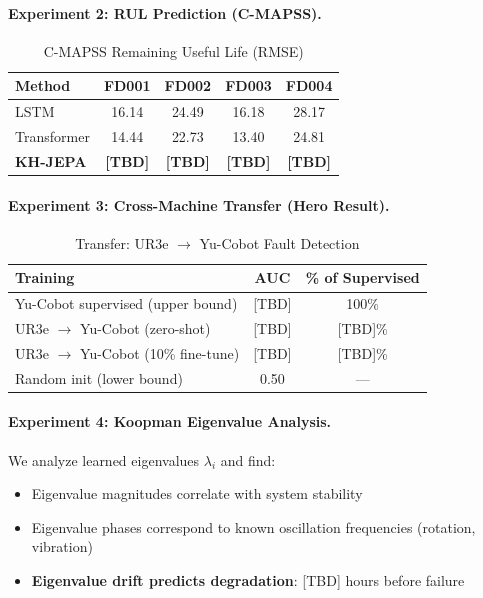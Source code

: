 \documentclass{article}
\begin{document}
\paragraph{Experiment 2: RUL Prediction (C-MAPSS).}

\begin{table}[h]
\centering
\caption{C-MAPSS Remaining Useful Life (RMSE)}
\begin{tabular}{lcccc}
\toprule
\textbf{Method} & \textbf{FD001} & \textbf{FD002} & \textbf{FD003} & \textbf{FD004} \\
\midrule
LSTM & 16.14 & 24.49 & 16.18 & 28.17 \\
Transformer & 14.44 & 22.73 & 13.40 & 24.81 \\
\textbf{KH-JEPA} & \textbf{[TBD]} & \textbf{[TBD]} & \textbf{[TBD]} & \textbf{[TBD]} \\
\bottomrule
\end{tabular}
\end{table}

\paragraph{Experiment 3: Cross-Machine Transfer (Hero Result).}

\begin{table}[h]
\centering
\caption{Transfer: UR3e $\rightarrow$ Yu-Cobot Fault Detection}
\begin{tabular}{lcc}
\toprule
\textbf{Training} & \textbf{AUC} & \textbf{\% of Supervised} \\
\midrule
Yu-Cobot supervised (upper bound) & [TBD] & 100\% \\
UR3e $\rightarrow$ Yu-Cobot (zero-shot) & [TBD] & [TBD]\% \\
UR3e $\rightarrow$ Yu-Cobot (10\% fine-tune) & [TBD] & [TBD]\% \\
Random init (lower bound) & 0.50 & — \\
\bottomrule
\end{tabular}
\end{table}

\paragraph{Experiment 4: Koopman Eigenvalue Analysis.}

We analyze learned eigenvalues $\lambda_i$ and find:
\begin{itemize}
    \item Eigenvalue magnitudes correlate with system stability
    \item Eigenvalue phases correspond to known oscillation frequencies (rotation, vibration)
    \item \textbf{Eigenvalue drift predicts degradation}: [TBD] hours before failure
\end{itemize}
\end{document}
